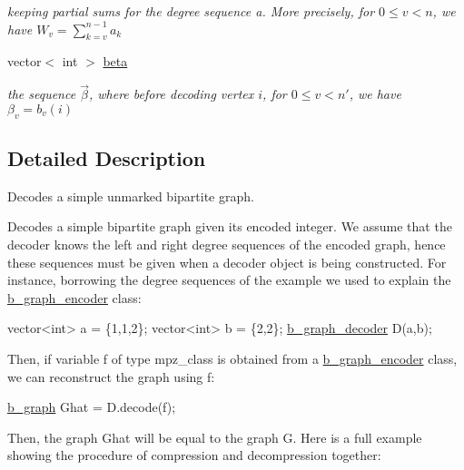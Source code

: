 \begin{DoxyCompactItemize}
\begin{DoxyCompactList}\small\item\em keeping partial sums for the degree sequence a. More precisely, for $0 \leq v < n$, we have $W_v = \sum_{k=v}^{n-1} a_k$ \end{DoxyCompactList}\item 
vector$<$ int $>$ \hyperlink{classb__graph__decoder_a3e5babfb07af486c1d9e991f65251266}{beta}
\begin{DoxyCompactList}\small\item\em the sequence $\vec{\beta}$, where before decoding vertex $i$, for $0 \leq v < n'$, we have $\beta_v = b_v(i)$ \end{DoxyCompactList}\end{DoxyCompactItemize}


\subsection{Detailed Description}
Decodes a simple unmarked bipartite graph. 

Decodes a simple bipartite graph given its encoded integer. We assume that the decoder knows the left and right degree sequences of the encoded graph, hence these sequences must be given when a decoder object is being constructed. For instance, borrowing the degree sequences of the example we used to explain the \hyperlink{classb__graph__encoder}{b\+\_\+graph\+\_\+encoder} class\+:


\begin{DoxyCode}
vector<int> a = \{1,1,2\};
vector<int> b = \{2,2\};
\hyperlink{classb__graph__decoder}{b\_graph\_decoder} D(a,b);
\end{DoxyCode}


Then, if variable f of type mpz\+\_\+class is obtained from a \hyperlink{classb__graph__encoder}{b\+\_\+graph\+\_\+encoder} class, we can reconstruct the graph using f\+:


\begin{DoxyCode}
\hyperlink{classb__graph}{b\_graph} Ghat = D.decode(f);
\end{DoxyCode}


Then, the graph Ghat will be equal to the graph G. Here is a full example showing the procedure of compression and decompression together\+:



